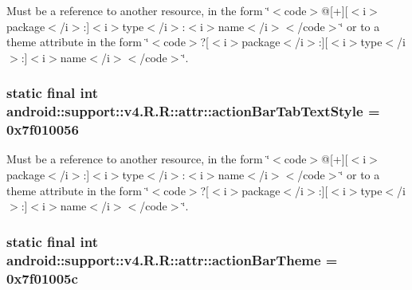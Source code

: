 Must be a reference to another resource, in the form \char`\"{}$<$code$>$@\mbox{[}+\mbox{]}\mbox{[}$<$i$>$package$<$/i$>$:\mbox{]}$<$i$>$type$<$/i$>$:$<$i$>$name$<$/i$>$$<$/code$>$\char`\"{} or to a theme attribute in the form \char`\"{}$<$code$>$?\mbox{[}$<$i$>$package$<$/i$>$:\mbox{]}\mbox{[}$<$i$>$type$<$/i$>$:\mbox{]}$<$i$>$name$<$/i$>$$<$/code$>$\char`\"{}. \hypertarget{classandroid_1_1support_1_1v4_1_1_r_1_1attr_a8d424009234d0c33008bfdb86a3493d}{
\subsubsection[{actionBarTabTextStyle}]{\setlength{\rightskip}{0pt plus 5cm}static final int android::support::v4.R.R::attr::actionBarTabTextStyle = 0x7f010056}}
\label{classandroid_1_1support_1_1v4_1_1_r_1_1attr_a8d424009234d0c33008bfdb86a3493d}


Must be a reference to another resource, in the form \char`\"{}$<$code$>$@\mbox{[}+\mbox{]}\mbox{[}$<$i$>$package$<$/i$>$:\mbox{]}$<$i$>$type$<$/i$>$:$<$i$>$name$<$/i$>$$<$/code$>$\char`\"{} or to a theme attribute in the form \char`\"{}$<$code$>$?\mbox{[}$<$i$>$package$<$/i$>$:\mbox{]}\mbox{[}$<$i$>$type$<$/i$>$:\mbox{]}$<$i$>$name$<$/i$>$$<$/code$>$\char`\"{}. \hypertarget{classandroid_1_1support_1_1v4_1_1_r_1_1attr_3ee4a8e4d249985f8f0a531633caac6f}{
\subsubsection[{actionBarTheme}]{\setlength{\rightskip}{0pt plus 5cm}static final int android::support::v4.R.R::attr::actionBarTheme = 0x7f01005c}}
\label{classandroid_1_1support_1_1v4_1_1_r_1_1attr_3ee4a8e4d249985f8f0a531633caac6f}


